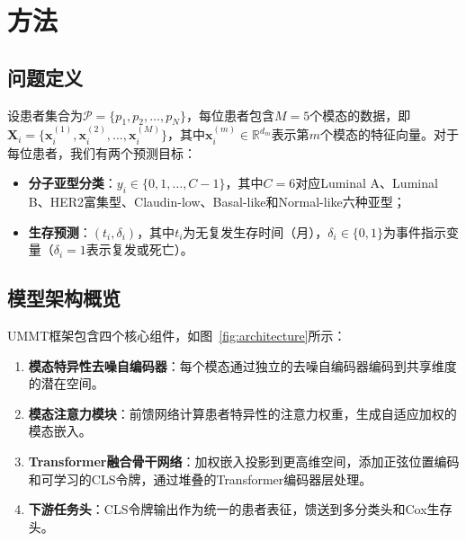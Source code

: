 \documentclass[conference]{IEEEtran}
\begin{document}
\section{方法}
\label{sec:methodology}

\subsection{问题定义}

设患者集合为$\mathcal{P}=\{p_1, p_2, \ldots, p_N\}$，每位患者包含$M=5$个模态的数据，即$\mathbf{X}_i = \{\mathbf{x}_i^{(1)}, \mathbf{x}_i^{(2)}, \ldots, \mathbf{x}_i^{(M)}\}$，其中$\mathbf{x}_i^{(m)} \in \mathbb{R}^{d_m}$表示第$m$个模态的特征向量。对于每位患者，我们有两个预测目标：
\begin{itemize}
    \item \textbf{分子亚型分类}：$y_i \in \{0, 1, \ldots, C-1\}$，其中$C=6$对应Luminal A、Luminal B、HER2富集型、Claudin-low、Basal-like和Normal-like六种亚型；
    \item \textbf{生存预测}：$(t_i, \delta_i)$，其中$t_i$为无复发生存时间（月），$\delta_i \in \{0, 1\}$为事件指示变量（$\delta_i=1$表示复发或死亡）。
\end{itemize}

\subsection{模型架构概览}

UMMT框架包含四个核心组件，如图~\ref{fig:architecture}所示：
\begin{enumerate}
    \item \textbf{模态特异性去噪自编码器}：每个模态通过独立的去噪自编码器编码到共享维度的潜在空间。
    \item \textbf{模态注意力模块}：前馈网络计算患者特异性的注意力权重，生成自适应加权的模态嵌入。
    \item \textbf{Transformer融合骨干网络}：加权嵌入投影到更高维空间，添加正弦位置编码和可学习的CLS令牌，通过堆叠的Transformer编码器层处理。
    \item \textbf{下游任务头}：CLS令牌输出作为统一的患者表征，馈送到多分类头和Cox生存头。
\end{enumerate}
\end{document}
